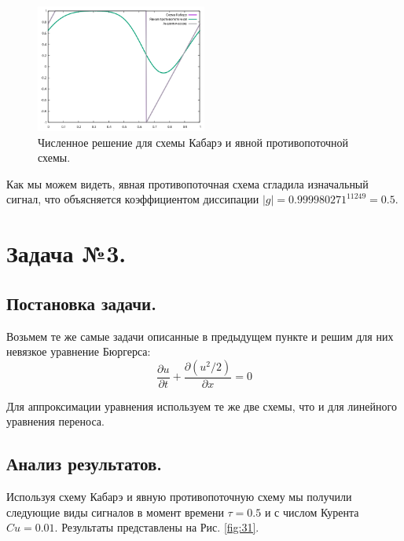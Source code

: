\begin{figure}[H]
    \centering
    \includegraphics[width=0.5\textwidth]{images/22.png}
    \caption{Численное решение для схемы Кабарэ и явной противопоточной схемы.}
    \label{fig:21}
\end{figure}
Как мы можем видеть, явная противопоточная схема сгладила изначальный сигнал, что объясняется коэффициентом диссипации $|g|=0.999980271^{11249}=0.5$.

\section{Задача №3.}
\subsection{Постановка задачи.}
Возьмем те же самые задачи описанные в предыдущем пункте и решим для них невязкое уравнение Бюргерса:
\begin{equation}
    \frac{\partial u}{\partial t}+\frac{\partial (u^2/2)}{\partial x}=0
\end{equation}

Для аппроксимации уравнения используем те же две схемы, что и для линейного уравнения переноса.

\subsection{Анализ результатов.}
Используя схему Кабарэ и явную противопоточную схему мы получили следующие виды сигналов в момент времени $\tau=0.5$ и с числом Курента $Cu=0.01$. Результаты представлены на Рис. \ref{fig:31}.

